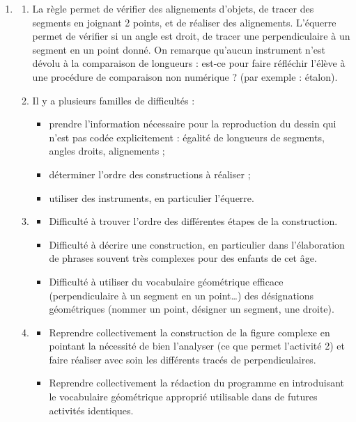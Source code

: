 \begin{corrige}
\begin{enumerate}
\begin{itemize}
    \end{itemize}
   \item 
   \begin{enumerate}
      \item La règle permet de vérifier des alignements d'objets, de tracer des segments en joignant 2 points, et de réaliser des alignements. L'équerre permet de vérifier si un angle est droit, de tracer une perpendiculaire à un segment en un point donné. On remarque qu'aucun instrument n'est dévolu à la comparaison de longueurs : est-ce pour faire réfléchir l'élève à une procédure de comparaison non numérique ? (par exemple : étalon).
      \item Il y a plusieurs \og familles \fg{} de difficultés :
      \begin{itemize}
         \item prendre l'information nécessaire pour la reproduction du dessin qui n'est pas codée explicitement : égalité de longueurs de segments, angles droits, alignements ;
         \item déterminer l'ordre des constructions à réaliser ;
         \item utiliser des instruments, en particulier l'équerre.
      \end{itemize}
      \item
      \begin{itemize}
         \item Difficulté à trouver l'ordre des différentes étapes de la construction.
         \item Difficulté à décrire une construction, en particulier dans l'élaboration de phrases souvent très complexes pour des enfants de cet âge.
         \item Difficulté à utiliser du vocabulaire géométrique efficace (perpendiculaire à un segment en un point\dots) des désignations géométriques (nommer un point, désigner un segment, une droite).
      \end{itemize}
      \item
      \begin{itemize}
         \item Reprendre collectivement la construction de la figure complexe en pointant la nécessité de bien l'analyser (ce que permet l'activité 2) et faire réaliser avec soin les différents tracés de perpendiculaires.
         \item Reprendre collectivement la rédaction du programme en introduisant le vocabulaire géométrique approprié utilisable dans de futures activités identiques.
   \end{itemize}
   \end{enumerate}
\end{enumerate}
\end{corrige}


